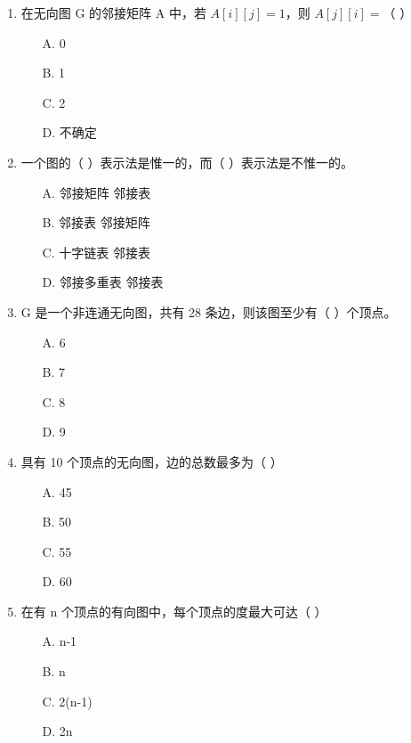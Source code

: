 \documentclass[12pt, a4paper]{article}
\begin{document}
\begin{enumerate}[label=\arabic*.]
	\item 在无向图 G 的邻接矩阵 A 中，若 $A[i][j]=1$，则 $A[j][i]=$（ ）
	      \begin{enumerate}
		      \item[A.] 0
		      \item[B.] 1
		      \item[C.] 2
		      \item[D.] 不确定
	      \end{enumerate}

	\item 一个图的（ ）表示法是惟一的，而（ ）表示法是不惟一的。
	      \begin{enumerate}
		      \item[A.] 邻接矩阵 邻接表
		      \item[B.] 邻接表 邻接矩阵
		      \item[C.] 十字链表 邻接表
		      \item[D.] 邻接多重表 邻接表
	      \end{enumerate}

	\item G 是一个非连通无向图，共有 28 条边，则该图至少有（ ）个顶点。
	      \begin{enumerate}
		      \item[A.] 6
		      \item[B.] 7
		      \item[C.] 8
		      \item[D.] 9
	      \end{enumerate}

	\item 具有 10 个顶点的无向图，边的总数最多为（ ）
	      \begin{enumerate}
		      \item[A.] 45
		      \item[B.] 50
		      \item[C.] 55
		      \item[D.] 60
	      \end{enumerate}

	\item 在有 n 个顶点的有向图中，每个顶点的度最大可达（ ）
	      \begin{enumerate}
		      \item[A.] n-1
		      \item[B.] n
		      \item[C.] 2(n-1)
		      \item[D.] 2n
	      \end{enumerate}


\end{enumerate}
\end{document}
